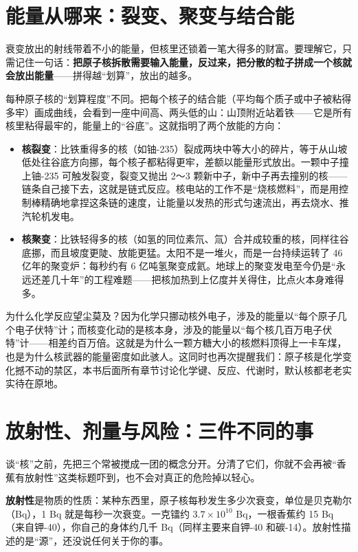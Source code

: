 \section{能量从哪来：裂变、聚变与结合能}

衰变放出的射线带着不小的能量，但核里还锁着一笔大得多的财富。要理解它，只需记住一句话：\textbf{把原子核拆散需要输入能量，反过来，把分散的粒子拼成一个核就会放出能量}——拼得越“划算”，放出的越多。

每种原子核的“划算程度”不同。把每个核子的结合能（平均每个质子或中子被粘得多牢）画成曲线，会看到一座中间高、两头低的山：山顶附近站着铁——它是所有核里粘得最牢的，能量上的“谷底”。这就指明了两个放能的方向：

\begin{itemize}[itemsep=2pt]
\item \textbf{核裂变}：比铁重得多的核（如铀-235）裂成两块中等大小的碎片，等于从山坡低处往谷底方向挪，每个核子都粘得更牢，差额以能量形式放出。一颗中子撞上铀-235 可触发裂变，裂变又抛出 2～3 颗新中子，新中子再去撞别的核——链条自己接下去，这就是链式反应。核电站的工作不是“烧核燃料”，而是用控制棒精确地拿捏这条链的速度，让能量以发热的形式匀速流出，再去烧水、推汽轮机发电。
\item \textbf{核聚变}：比铁轻得多的核（如氢的同位素氘、氚）合并成较重的核，同样往谷底挪，而且坡度更陡、放能更猛。太阳不是一堆火，而是一台持续运转了 46 亿年的聚变炉：每秒约有 6 亿吨氢聚变成氦。地球上的聚变发电至今仍是“永远还差几十年”的工程难题——把核加热到上亿度并关得住，比点火本身难得多。
\end{itemize}

为什么化学反应望尘莫及？因为化学只挪动核外电子，涉及的能量以“每个原子几个电子伏特”计；而核变化动的是核本身，涉及的能量以“每个核几百万电子伏特”计——相差约百万倍。这就是为什么一颗方糖大小的核燃料顶得上一卡车煤，也是为什么核武器的能量密度如此骇人。这同时也再次提醒我们：原子核是化学变化撼不动的禁区，本书后面所有章节讨论化学键、反应、代谢时，默认核都老老实实待在原地。

\section{放射性、剂量与风险：三件不同的事}

谈“核”之前，先把三个常被搅成一团的概念分开。分清了它们，你就不会再被“香蕉有放射性”这类标题吓到，也不会对真正的危险掉以轻心。

\textbf{放射性}是物质的性质：某种东西里，原子核每秒发生多少次衰变，单位是贝克勒尔（Bq），1 Bq 就是每秒一次衰变。一克镭约 $3.7\times 10^{10}$ Bq，一根香蕉约 15 Bq（来自钾-40），你自己的身体约几千 Bq（同样主要来自钾-40 和碳-14）。放射性描述的是“源”，还没说任何关于你的事。

